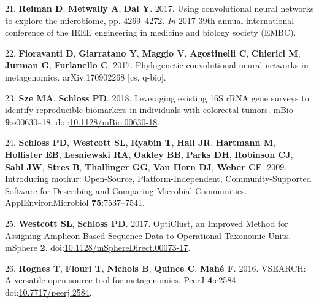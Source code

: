 \documentclass[11pt,]{article}
\begin{document}
\hypertarget{ref-reiman_using_2017}{}
21. \textbf{Reiman D}, \textbf{Metwally A}, \textbf{Dai Y}. 2017. Using
convolutional neural networks to explore the microbiome, pp. 4269--4272.
\emph{In} 2017 39th annual international conference of the IEEE
engineering in medicine and biology society (EMBC).

\hypertarget{ref-fioravanti_phylogenetic_2017}{}
22. \textbf{Fioravanti D}, \textbf{Giarratano Y}, \textbf{Maggio V},
\textbf{Agostinelli C}, \textbf{Chierici M}, \textbf{Jurman G},
\textbf{Furlanello C}. 2017. Phylogenetic convolutional neural networks
in metagenomics. arXiv:170902268 {[}cs, q-bio{]}.

\hypertarget{ref-sze_leveraging_2018}{}
23. \textbf{Sze MA}, \textbf{Schloss PD}. 2018. Leveraging existing 16S
rRNA gene surveys to identify reproducible biomarkers in individuals
with colorectal tumors. mBio \textbf{9}:e00630--18.
doi:\href{https://doi.org/10.1128/mBio.00630-18}{10.1128/mBio.00630-18}.

\hypertarget{ref-schloss_introducing_2009}{}
24. \textbf{Schloss PD}, \textbf{Westcott SL}, \textbf{Ryabin T},
\textbf{Hall JR}, \textbf{Hartmann M}, \textbf{Hollister EB},
\textbf{Lesniewski RA}, \textbf{Oakley BB}, \textbf{Parks DH},
\textbf{Robinson CJ}, \textbf{Sahl JW}, \textbf{Stres B},
\textbf{Thallinger GG}, \textbf{Van Horn DJ}, \textbf{Weber CF}. 2009.
Introducing mothur: Open-Source, Platform-Independent,
Community-Supported Software for Describing and Comparing Microbial
Communities. ApplEnvironMicrobiol \textbf{75}:7537--7541.

\hypertarget{ref-westcott_opticlust_2017}{}
25. \textbf{Westcott SL}, \textbf{Schloss PD}. 2017. OptiClust, an
Improved Method for Assigning Amplicon-Based Sequence Data to
Operational Taxonomic Units. mSphere \textbf{2}.
doi:\href{https://doi.org/10.1128/mSphereDirect.00073-17}{10.1128/mSphereDirect.00073-17}.

\hypertarget{ref-rognes_vsearch_2016}{}
26. \textbf{Rognes T}, \textbf{Flouri T}, \textbf{Nichols B},
\textbf{Quince C}, \textbf{Mahé F}. 2016. VSEARCH: A versatile open
source tool for metagenomics. PeerJ \textbf{4}:e2584.
doi:\href{https://doi.org/10.7717/peerj.2584}{10.7717/peerj.2584}.
\end{document}

